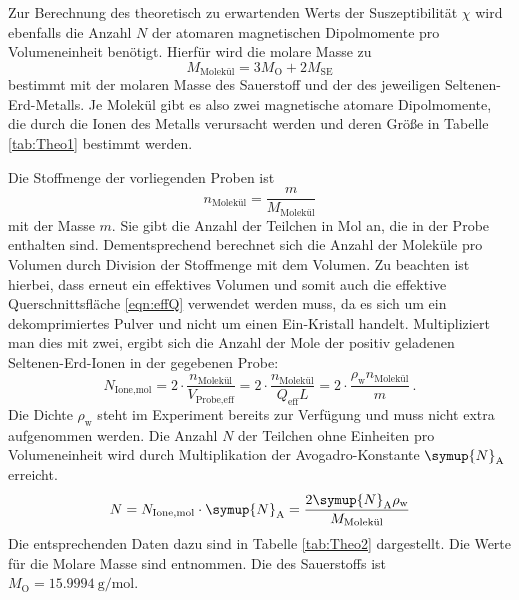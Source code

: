     Zur Berechnung des theoretisch zu erwartenden Werts der Suszeptibilität $\chi$ wird ebenfalls die Anzahl $N$ der atomaren magnetischen 
    Dipolmomente pro Volumeneinheit benötigt. 
    Hierfür wird die molare Masse zu 
    \begin{equation*}
        M_\text{Molekül}=3M_\text{O}+2M_\text{SE}
    \end{equation*}
    bestimmt mit der molaren Masse des Sauerstoff und der des jeweiligen Seltenen-Erd-Metalls. 
    Je Molekül gibt es also zwei magnetische atomare Dipolmomente, die durch die Ionen des Metalls verursacht werden und 
    deren Größe in Tabelle \ref{tab:Theo1} bestimmt werden.

    Die Stoffmenge der vorliegenden Proben ist 
    \begin{equation*}
        n_\text{Molekül}=\frac{m}{M_\text{Molekül}}
    \end{equation*}
    mit der Masse $m$. 
    Sie gibt die Anzahl der Teilchen in Mol an, die in der Probe enthalten sind. 
    Dementsprechend berechnet sich die Anzahl der Moleküle pro Volumen durch Division der Stoffmenge mit dem Volumen. 
    Zu beachten ist hierbei, dass erneut ein effektives Volumen und somit auch die effektive Querschnittsfläche \eqref{eqn:effQ} verwendet 
    werden muss, da es sich um ein dekomprimiertes Pulver und nicht um einen Ein-Kristall handelt.
    Multipliziert man dies mit zwei, ergibt sich die Anzahl der Mole der positiv geladenen Seltenen-Erd-Ionen in der gegebenen Probe:
    \begin{equation*}
        N_\text{Ione,mol}=2\cdot\frac{n_\text{Molekül}}{V_\text{Probe,eff}}=2\cdot\frac{n_\text{Molekül}}{Q_\text{eff}L}
        =2\cdot\frac{\rho _\text{w} n_\text{Molekül}}{m}\,.
    \end{equation*}
    Die Dichte $\rho _\text{w}$ steht im Experiment bereits zur Verfügung und muss nicht extra aufgenommen werden. 
    Die Anzahl $N$ der Teilchen ohne Einheiten pro Volumeneinheit wird durch Multiplikation der Avogadro-Konstante $\symup{N}_\text{A}$ erreicht.
    \begin{equation*}
        N=N_\text{Ione,mol}\cdot \symup{N}_\text{A}=\frac{2\symup{N}_\text{A}\rho_\text{w}}{M_\text{Molekül}}
    \end{equation*}
    Die entsprechenden Daten dazu sind in Tabelle \ref{tab:Theo2} dargestellt. 
    Die Werte für die Molare Masse sind \cite[610]{kohlrausch} entnommen.
    Die des Sauerstoffs ist $M_\text{O}=\SI{15.9994}{\gram\per\mole}$.

